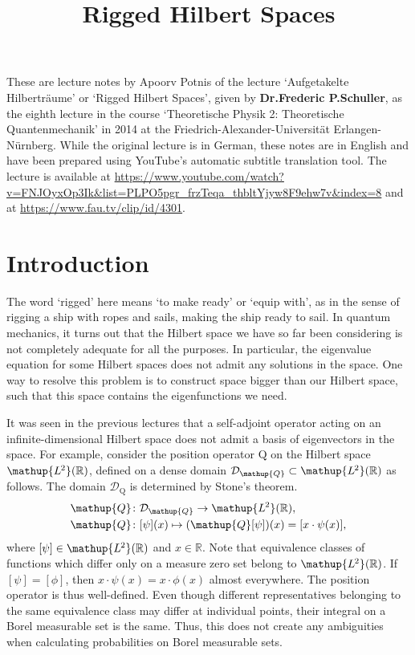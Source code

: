 \documentclass{article}
\title{Rigged Hilbert Spaces}
\author{}
\date{\vspace{-5ex}}
\theoremstyle{definition}
\newcommand{\ltwo}{\mathup{L\kern-0.5pt^2}}
\newcommand{\position}{\mathup{Q}}
\newcommand{\rr}{\mathbb{R}}
\newcommand{\ltwor}{\ltwo(\rr)}
\newcommand{\domain}{\mathcal{D}}
\begin{document}
	\maketitle

	These are lecture notes by Apoorv Potnis of the lecture `Aufgetakelte Hilberträume' or `Rigged Hilbert Spaces', given by \textbf{Dr.\@ Frederic P.\@ Schuller}, as the eighth lecture in the course `Theoretische Physik 2: Theoretische Quantenmechanik' in 2014 at the Friedrich-Alexander-Universität Erlangen-Nürnberg. While the original lecture is in German, these notes are in English and have been prepared using YouTube's automatic subtitle translation tool. The lecture is available at \url{https://www.youtube.com/watch?v=FNJOyxOp3Ik&list=PLPO5pgr_frzTeqa_thbltYjyw8F9ehw7v&index=8} and at \url{https://www.fau.tv/clip/id/4301}.

	\tableofcontents{}

	\section{Introduction}

	The word `rigged' here means `to make ready' or `equip with', as in the sense of rigging a ship with ropes and sails, making the ship ready to sail. In quantum mechanics, it turns out that the Hilbert space we have so far been considering is not completely adequate for all the purposes. In particular, the eigenvalue equation for some Hilbert spaces does not admit any solutions in the space. One way to resolve this problem is to construct space bigger than our Hilbert space, such that this space contains the eigenfunctions we need.

	It was seen in the previous lectures that a self-adjoint operator acting on an infinite-dimensional Hilbert space does not admit a basis of eigenvectors in the space. For example, consider the position operator $\position$ on the Hilbert space \(\ltwor\), defined on a dense domain \(\domain_{\position} \subset \ltwor\) as follows. The domain $\domain_{\position}$ is determined by Stone's  theorem.
	\begin{align*}
		\position &\colon \domain_\position \rightarrow \ltwor,\\
		\position &\colon [\psi](x) \mapsto (\position[\psi])(x) = [x \cdot \psi(x)],
	\end{align*}
	where \([\psi] \in \ltwor\) and \(x \in \rr\). Note that equivalence classes of functions which differ only on a measure zero set belong to \(\ltwor\). If $[\psi] = [\phi]$, then $x \cdot \psi(x) = x \cdot \phi(x)$ almost everywhere. The position operator is thus well-defined. Even though different representatives belonging to the same equivalence class may differ at individual points, their integral on a Borel measurable set is the same. Thus, this does not create any ambiguities when calculating probabilities on Borel measurable sets.
\end{document}
